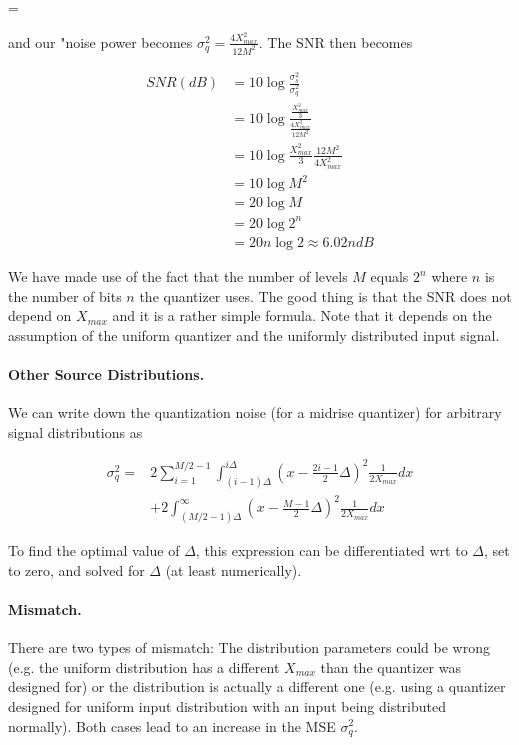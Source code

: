 \bee
\Delta = 
\eee

and our "noise power becomes $\sigma_q^2 = \frac{4 X^2_{max}}{12 M^2}$. The SNR then becomes

\begin{align*}
    SNR(dB) &= 10 \log \frac{\sigma_s^2}{\sigma_q^2} \\
&= 10 \log \frac{ \frac{X^2_{max}}{3} }{ \frac{4 X^2_{max}}{12 M^2} } \\
&= 10 \log \frac{X^2_{max}}{3} \frac{12 M^2}{4 X^2_{max}} \\
&= 10 \log M^2 \\
&= 20 \log M \\
&= 20 \log 2^n \\
&= 20 n \log 2 \approx 6.02 n dB
\end{align*}

We have made use of the fact that the number of levels $M$ equals $2^n$ where $n$ is the number of bits $n$ the quantizer uses. The good thing is that the SNR does not depend on $X_{max}$ and it is a rather simple formula. Note that it depends on the assumption of the uniform quantizer and the uniformly distributed input signal.

\paragraph{Other Source Distributions.} We can write down the quantization noise (for a midrise quantizer) for arbitrary signal distributions as

\begin{align*}
    \sigma_q^2 = &2 \sum_{i=1}^{M/2-1} \int_{(i-1) \Delta}^{i \Delta} \left(x - \frac{2i-1}{2} \Delta \right)^2 \frac{1}{2 X_{max}} dx \\
    &+ 2 \int_{(M/2-1)\Delta}^{\infty} \left(x - \frac{M-1}{2} \Delta \right)^2 \frac{1}{2 X_{max}} dx
\end{align*}

To find the optimal value of $\Delta$, this expression can be differentiated wrt to $\Delta$, set to zero, and solved for $\Delta$ (at least numerically).

\paragraph{Mismatch.} There are two types of mismatch: The distribution parameters could be wrong (e.g. the uniform distribution has a different $X_{max}$ than the quantizer was designed for) or the distribution is actually a different one (e.g. using a quantizer designed for uniform input distribution with an input being distributed normally). Both cases lead to an increase in the MSE $\sigma_q^2$.

